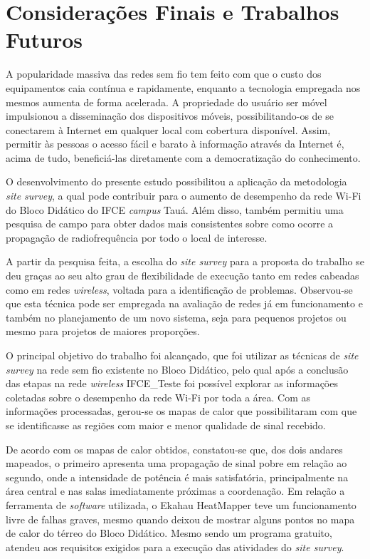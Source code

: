 \chapter{Considerações Finais e Trabalhos Futuros}
\label{cap:conclusoes-e-trabalhos-futuros}

A popularidade massiva das redes sem fio tem feito com que o custo dos equipamentos caia contínua e rapidamente, enquanto a tecnologia empregada nos mesmos aumenta de forma acelerada. A propriedade do usuário ser móvel impulsionou a disseminação dos dispositivos móveis, possibilitando-os de se conectarem à Internet em qualquer local com cobertura disponível. Assim, permitir às pessoas o acesso fácil e barato à informação através da Internet é, acima de tudo, beneficiá-las diretamente com a democratização do conhecimento.

O desenvolvimento do presente estudo possibilitou a aplicação da metodologia \textit{site survey}, a qual pode contribuir para o aumento de desempenho da rede Wi-Fi do Bloco Didático do IFCE \textit{campus} Tauá. Além disso, também permitiu uma pesquisa de campo para obter dados mais consistentes sobre como ocorre a propagação de radiofrequência por todo o local de interesse.

A partir da pesquisa feita, a escolha do \textit{site survey} para a proposta do trabalho se deu graças ao seu alto grau de flexibilidade de execução tanto em redes cabeadas como em redes \textit{wireless}, voltada para a identificação de problemas. Observou-se que esta técnica pode ser empregada na avaliação de redes já em funcionamento e também no planejamento de um novo sistema, seja para pequenos projetos ou mesmo para projetos de maiores proporções.

O principal objetivo do trabalho foi alcançado, que foi utilizar as técnicas de \textit{site survey} na rede sem fio existente no Bloco Didático, pelo qual após a conclusão das etapas na rede \textit{wireless} IFCE\_Teste foi possível explorar as informações coletadas sobre o desempenho da rede Wi-Fi por toda a área. Com as informações processadas, gerou-se os mapas de calor que possibilitaram com que se identificasse as regiões com maior e menor qualidade de sinal recebido.

De acordo com os mapas de calor obtidos, constatou-se que, dos dois andares mapeados, o primeiro apresenta uma propagação de sinal pobre em relação ao segundo, onde a intensidade de potência é mais satisfatória, principalmente na área central e nas salas imediatamente próximas a coordenação.
Em relação a ferramenta de \textit{software} utilizada, o Ekahau HeatMapper teve um funcionamento livre de falhas graves, mesmo quando deixou de mostrar alguns pontos no mapa de calor do térreo do Bloco Didático. Mesmo sendo um programa gratuito, atendeu aos requisitos exigidos para a execução das atividades do \textit{site survey}.

